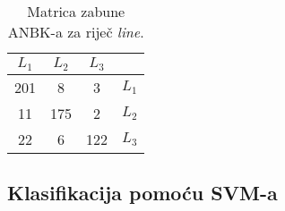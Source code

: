 \documentclass[10pt, a4paper]{article}
\begin{document}
\begin{table}[!hbtp]
\caption{Matrica zabune ANBK-a za riječ \emph{line}.}
\label{tab:line_confusion_bayes}
\begin{center}
\begin{tabular}{|ccc|c|}
\hline
$L_1$ & $L_2$ & $L_3$ &  \\
\hline
  201 &  8  &  3  &   $L_1$ \\
  11  & 175 &  2  &   $L_2$ \\
  22  & 6   & 122 &   $L_3$ \\
\hline
\end{tabular}
\end{center}
\end{table}

\subsection{Klasifikacija pomoću SVM-a}
\end{document}
